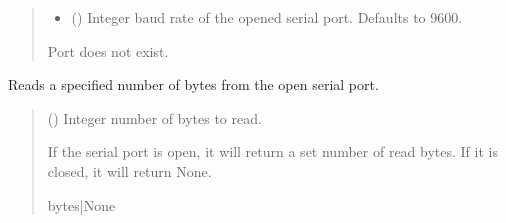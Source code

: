 \documentclass[letterpaper,10pt,english]{sphinxmanual}
\begin{document}
\begin{fulllineitems}
\begin{fulllineitems}
\begin{quote}
\begin{description}
\begin{itemize}
\item {} 
\sphinxAtStartPar
{} (\sphinxstyleliteralemphasis{\sphinxupquote{, }}) \textendash{} Integer baud rate of the opened serial port. Defaults to 9600.

\end{itemize}

\sphinxAtStartPar
{} \textendash{} Port does not exist.

\end{description}\end{quote}

\end{fulllineitems}


\begin{fulllineitems}
\label{\detokenize{SerialCommunication:SerialCommunication.COM_io.Read}}
\pysigstartsignatures
{}
\pysigstopsignatures
\sphinxAtStartPar
Reads a specified number of bytes from the open serial port.
\begin{quote}\begin{description}
\sphinxAtStartPar
{} () \textendash{} Integer number of bytes to read.

\sphinxAtStartPar
If the serial port is open, it will return a set number of read bytes.                 If it is closed, it will return None.

\sphinxAtStartPar
bytes|None

\end{description}\end{quote}

\end{fulllineitems}



\end{fulllineitems}
\end{document}
